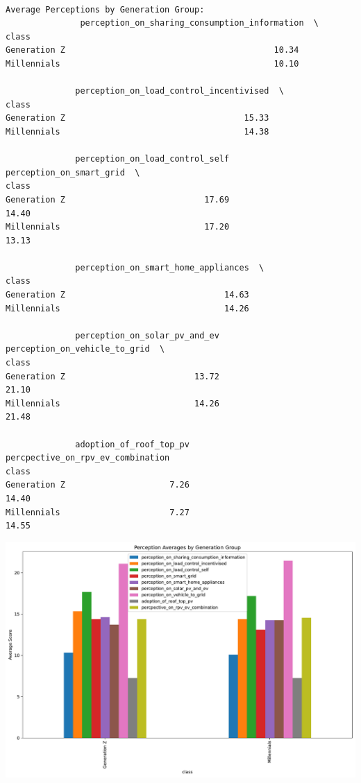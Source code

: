 \documentclass[
  letterpaper,
  DIV=11,
  numbers=noendperiod]{scrartcl}
\begin{document}
\begin{verbatim}

Average Perceptions by Generation Group:
               perception_on_sharing_consumption_information  \
class                                                         
Generation Z                                          10.34   
Millennials                                           10.10   

              perception_on_load_control_incentivised  \
class                                                   
Generation Z                                    15.33   
Millennials                                     14.38   

              perception_on_load_control_self  perception_on_smart_grid  \
class                                                                     
Generation Z                            17.69                     14.40   
Millennials                             17.20                     13.13   

              perception_on_smart_home_appliances  \
class                                               
Generation Z                                14.63   
Millennials                                 14.26   

              perception_on_solar_pv_and_ev  perception_on_vehicle_to_grid  \
class                                                                        
Generation Z                          13.72                          21.10   
Millennials                           14.26                          21.48   

              adoption_of_roof_top_pv  percpective_on_rpv_ev_combination  
class                                                                     
Generation Z                     7.26                              14.40  
Millennials                      7.27                              14.55  
\end{verbatim}

\includegraphics{index_files/figure-pdf/cell-7-output-2.pdf}
\end{document}
